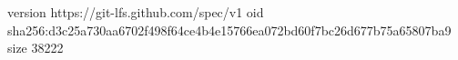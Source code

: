 version https://git-lfs.github.com/spec/v1
oid sha256:d3c25a730aa6702f498f64ce4b4e15766ea072bd60f7bc26d677b75a65807ba9
size 38222
